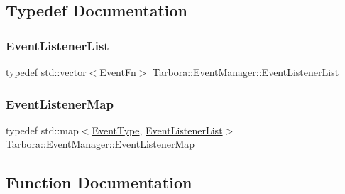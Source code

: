 \subsection{Typedef Documentation}
\mbox{\label{namespaceTarbora_1_1EventManager_af2a8ccc3af56c94f352b42f5efa966dd}} 
\subsubsection{\texorpdfstring{Event\+Listener\+List}{EventListenerList}}
{\footnotesize\ttfamily typedef std\+::vector$<$\hyperlink{namespaceTarbora_a418b0f026f0664511b2a0c4129edc11f}{Event\+Fn}$>$ \hyperlink{namespaceTarbora_1_1EventManager_af2a8ccc3af56c94f352b42f5efa966dd}{Tarbora\+::\+Event\+Manager\+::\+Event\+Listener\+List}}

\mbox{\label{namespaceTarbora_1_1EventManager_a9254759257c0dc7fd52908f87bfa68ec}} 
\subsubsection{\texorpdfstring{Event\+Listener\+Map}{EventListenerMap}}
{\footnotesize\ttfamily typedef std\+::map$<$\hyperlink{namespaceTarbora_a70bd9c4d542b943fff3793f78189967e}{Event\+Type}, \hyperlink{namespaceTarbora_1_1EventManager_af2a8ccc3af56c94f352b42f5efa966dd}{Event\+Listener\+List}$>$ \hyperlink{namespaceTarbora_1_1EventManager_a9254759257c0dc7fd52908f87bfa68ec}{Tarbora\+::\+Event\+Manager\+::\+Event\+Listener\+Map}}



\subsection{Function Documentation}
\mbox{\label{namespaceTarbora_1_1EventManager_a7296edcf388f134db3dbf86787ce7040}} 
